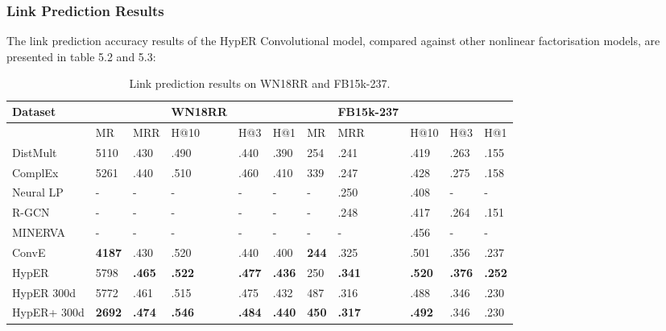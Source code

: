 \subsubsection{Link Prediction Results}
The link prediction accuracy results of the HypER Convolutional model, compared against other nonlinear factorisation models, are presented in table 5.2 and 5.3:

\begin{table}[H]
\caption{Link prediction results on WN18RR and FB15k-237.}
\centering
\begin{tabular}{lllllllllll}
  \textbf{Dataset} & & &  \textbf{WN18RR} & & & & \textbf{FB15k-237} \\
  \hline 
                    	& MR    		& MRR    		& H@10		& H@3    		& H@1    		& MR    		& MRR    		& H@10     	& H@3     		& H@1 \\
  \hline
  DistMult      	& 5110  		& .430      		& .490      		& .440       	& .390     		& 254      		& .241     		& .419        	& .263       	& .155 \\
  ComplEx    	& 5261       	& .440      		& .510     		& .460       	& .410     		& 339        	& .247      		& .428       	& .275       	& .158 \\
  Neural LP   	& -       		& -      		& -      		& -             	& -          		& -        		& .250      		& .408         	& -             	& - \\
  R-GCN       	& -       		& -      		& - 			& -       		& -     		& -        		& .248     		& .417         	& .264       	& .151 \\
  MINERVA        & -       		& -      		& -      		& -       		& -     		& -        		& -      		& .456        	& -       		& - \\
  ConvE        	& \textbf{4187}  & .430   		& .520      		& .440  		& .400  		& \textbf{244}   	& .325  		& .501  		& .356  		& .237 \\
  HypER       	& 5798   		& \textbf{.465}  	& \textbf{.522}  	& \textbf{.477}  	& \textbf{.436}  	& 250   		& \textbf{.341}  	& \textbf{.520}  	& \textbf{.376}  	& \textbf{.252} \\
  \hline
  HypER 300d 	& 5772 		& .461    		& .515      		& .475        	& .432     		& 487      		& .316      		& .488       	& .346        	& .230 \\
  HypER+ 300d	& \textbf{2692} 	& \textbf{.474}  	& \textbf{.546}  	& \textbf{.484}  	&  \textbf{.440} 	& \textbf{450}   	& \textbf{.317}  	& \textbf{.492}  	& .346   		& .230

\end{tabular}
\end{table}


